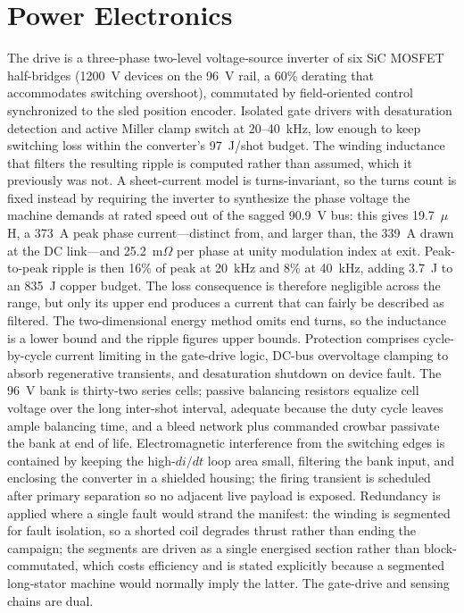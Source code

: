 \documentclass[conference]{IEEEtran}
\begin{document}
\section{Power Electronics}\label{sec:pe}
The drive is a three-phase two-level voltage-source inverter of six SiC MOSFET half-bridges (1200~V devices on the 96~V rail, a 60\% derating that accommodates switching overshoot), commutated by field-oriented control synchronized to the sled position encoder. Isolated gate drivers with desaturation detection and active Miller clamp switch at 20--40~kHz, low enough to keep switching loss within the converter's 97~J/shot budget. The winding inductance that filters the resulting ripple is computed rather than assumed, which it previously was not. A sheet-current model is turns-invariant, so the turns count is fixed instead by requiring the inverter to synthesize the phase voltage the machine demands at rated speed out of the sagged 90.9~V bus: this gives 19.7~$\mu$H, a 373~A peak phase current---distinct from, and larger than, the 339~A drawn at the DC link---and 25.2~m$\Omega$ per phase at unity modulation index at exit. Peak-to-peak ripple is then 16\% of peak at 20~kHz and 8\% at 40~kHz, adding 3.7~J to an 835~J copper budget. The loss consequence is therefore negligible across the range, but only its upper end produces a current that can fairly be described as filtered. The two-dimensional energy method omits end turns, so the inductance is a lower bound and the ripple figures upper bounds. Protection comprises cycle-by-cycle current limiting in the gate-drive logic, DC-bus overvoltage clamping to absorb regenerative transients, and desaturation shutdown on device fault. The 96~V bank is thirty-two series cells; passive balancing resistors equalize cell voltage over the long inter-shot interval, adequate because the duty cycle leaves ample balancing time, and a bleed network plus commanded crowbar passivate the bank at end of life. Electromagnetic interference from the switching edges is contained by keeping the high-$di/dt$ loop area small, filtering the bank input, and enclosing the converter in a shielded housing; the firing transient is scheduled after primary separation so no adjacent live payload is exposed. Redundancy is applied where a single fault would strand the manifest: the winding is segmented for fault isolation, so a shorted coil degrades thrust rather than ending the campaign; the segments are driven as a single energised section rather than block-commutated, which costs efficiency and is stated explicitly because a segmented long-stator machine would normally imply the latter. The gate-drive and sensing chains are dual.
\end{document}
